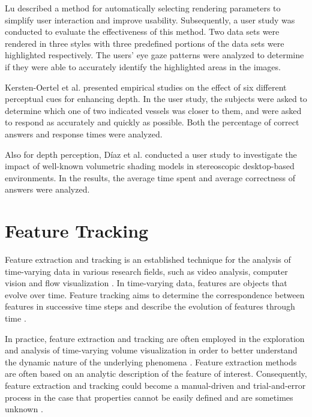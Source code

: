 Lu \cite{lu_volume_2010} described a method for automatically selecting rendering parameters to simplify user interaction and improve usability. Subsequently, a user study was conducted to evaluate the effectiveness of this method. Two data sets were rendered in three styles with three predefined portions of the data sets were highlighted respectively. The users' eye gaze patterns were analyzed to determine if they were able to accurately identify the highlighted areas in the images.

Kersten-Oertel et al. \cite{kersten-oertel_evaluation_2014} presented empirical studies on the effect of six different perceptual cues for enhancing depth. In the user study, the subjects were asked to determine which one of two indicated vessels was closer to them, and were asked to respond as accurately and quickly as possible. Both the percentage of correct answers and response times were analyzed.

Also for depth perception, D{\'i}az et al. \cite{diaz_perceptual_2015} conducted a user study to investigate the impact of well-known volumetric shading models \cite{kniss_model_2003} in stereoscopic desktop-based environments. In the results, the average time spent and average correctness of answers were analyzed.

\section{Feature Tracking}
Feature extraction and tracking is an established technique for the analysis of time-varying data in various research fields, such as video analysis, computer vision and flow visualization \cite{muelder_interactive_2009}.
In time-varying data, features are objects that evolve over time. Feature tracking aims to determine the correspondence between features in successive time steps and describe the evolution of features through time \cite{post_state_2003}.

In practice, feature extraction and tracking are often employed in the exploration and analysis of time-varying volume visualization in order to better understand the dynamic nature of the underlying phenomena \cite{wang_information_2008} \cite{woodring_multiscale_2009} \cite{lee_visualizing_2009}.
Feature extraction methods are often based on an analytic description of the feature of interest. Consequently, feature extraction and tracking could become a manual-driven and trial-and-error process in the case that properties cannot be easily defined and are sometimes unknown \cite{ma_machine_2007}.


